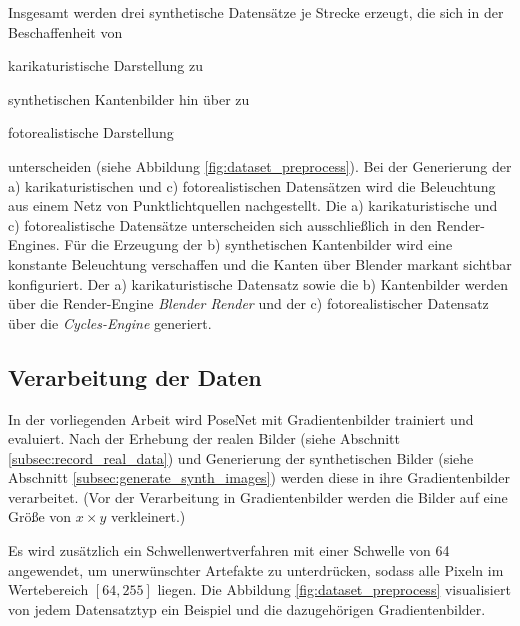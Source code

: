 Insgesamt werden drei synthetische Datensätze je Strecke erzeugt, die sich in der Beschaffenheit von \begin{enumerate*}[label=\alph*)]
	\item karikaturistische Darstellung zu
	\item synthetischen Kantenbilder hin über zu
	\item fotorealistische Darstellung
\end{enumerate*} unterscheiden (siehe Abbildung \ref{fig:dataset_preprocess}). Bei der Generierung der a) karikaturistischen und c) fotorealistischen Datensätzen wird die Beleuchtung aus einem Netz von Punktlichtquellen nachgestellt. Die a) karikaturistische und c) fotorealistische Datensätze unterscheiden sich ausschließlich in den Render-Engines.
Für die Erzeugung der b) synthetischen Kantenbilder wird eine konstante Beleuchtung verschaffen und die Kanten über Blender markant sichtbar konfiguriert. Der a) karikaturistische Datensatz sowie die b) Kantenbilder werden über die Render-Engine \textit{Blender Render} und der c) fotorealistischer Datensatz über die \textit{Cycles-Engine} generiert.



\subsection{Verarbeitung der Daten}
In der vorliegenden Arbeit wird PoseNet mit Gradientenbilder trainiert und evaluiert. Nach der Erhebung der realen Bilder (siehe Abschnitt \ref{subsec:record_real_data}) und Generierung der synthetischen Bilder (siehe Abschnitt \ref{subsec:generate_synth_images}) werden diese in ihre Gradientenbilder verarbeitet. 
(Vor der Verarbeitung in Gradientenbilder werden die Bilder auf eine Größe von $x \times y$ verkleinert.)


Es wird zusätzlich ein Schwellenwertverfahren mit einer Schwelle von 64 angewendet, um unerwünschter Artefakte zu unterdrücken, sodass alle Pixeln im Wertebereich $[64, 255]$ liegen. Die Abbildung \ref{fig:dataset_preprocess} visualisiert von jedem Datensatztyp ein Beispiel und die dazugehörigen Gradientenbilder.


